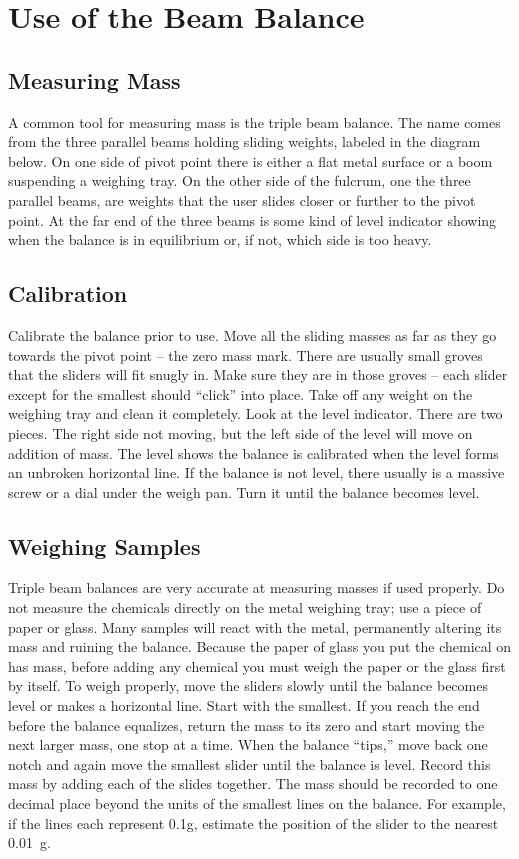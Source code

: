 \chapter{Use of the Beam Balance}

\section{Measuring Mass}

A common tool for measuring mass is the triple beam balance. The name comes from the three parallel beams holding sliding weights, labeled in the diagram below. On one side of pivot point there is either a flat metal surface or a boom suspending a weighing tray. On the other side of the fulcrum, one the three parallel beams, are weights that the user slides closer or further to the pivot point. At the far end of the three beams is some kind of level indicator showing when the balance is in equilibrium or, if not, which side is too heavy.

\section{Calibration}

Calibrate the balance prior to use. Move all the sliding masses as far as they go towards the pivot point – the zero mass mark. There are usually small groves that the sliders will fit snugly in. Make sure they are in those groves – each slider except for the smallest should “click” into place. Take off any weight on the weighing tray and clean it completely. Look at the level indicator. There are two pieces. The right side not moving, but the left side of the level will move on addition of mass. The level shows the balance is calibrated when the level forms an unbroken horizontal line. If the balance is not level, there usually is a massive screw or a dial under the weigh pan. Turn it until the balance becomes level.

\section{Weighing Samples}

Triple beam balances are very accurate at measuring masses if used properly. Do not measure the chemicals directly on the metal weighing tray; use a piece of paper or glass. Many samples will react with the metal, permanently altering its mass and ruining the balance. Because the paper of glass you put the chemical on has mass, before adding any chemical you must weigh the paper or the glass first by itself. To weigh properly, move the sliders slowly until the balance becomes level or makes a horizontal line. Start with the smallest. If you reach the end before the balance equalizes, return the mass to its zero and start moving the next larger mass, one stop at a time. When the balance “tips,” move back one notch and again move the smallest slider until the balance is level. Record this mass by adding each of the slides together. The mass should be recorded to one decimal place beyond the units of the smallest lines on the balance. For example, if the lines each represent 0.1g, estimate the position of the slider to the nearest 0.01~g.

